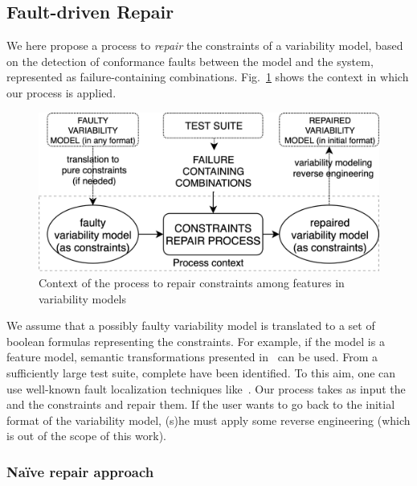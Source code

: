 \begin{tikzborder}{\cite{Gargantini16:validation}}
\begin{tikzborder}{\cite{gargantini_combinatorial_2017}}
\begin{tikzborder}{\cite{gargantini_combinatorial_2017}}
\begin{tikzborder}{\cite{garn2019}}
\begin{tikzborder}{\cite{arcaini2019achieving}}
\begin{tikzborder}{\cite{arcaini2019varivolution}}
		\subsection{Fault-driven Repair}\label{sec:repair}
		
		\bb We here propose a process to {\it repair} the constraints of a variability model, based on the detection of conformance faults between the model and the system, represented as failure-containing combinations. Fig.~\ref{fig:splrepair} shows the context in which our process is applied. \be
		\begin{figure}[!ht]
			\centering
			\includegraphics[width=.8\columnwidth]{images/splrepair_new.png}
			\caption{Context of the process to repair constraints among features in variability models}
			\label{fig:splrepair}
		\end{figure}
		
		\bb We assume that a possibly faulty variability model is translated to a set of boolean formulas representing the constraints. For example, if the model is a feature model, semantic transformations presented in~\cite{batory2005feature} can be used. From a sufficiently large test suite, complete \fccs have been identified. To this aim, one can use well-known fault localization techniques like~\cite{ben_2015,iwct19}. Our process takes as input the \fccs and the constraints and repair them. If the user wants to go back to the initial format of the variability model, (s)he must apply some reverse engineering (which is out of the scope of this work).
		
		\be
		
		\subsubsection{Na{\"i}ve repair approach}\label{sec:naiveAppr}
		

\end{tikzborder}
\end{tikzborder}
\end{tikzborder}
\end{tikzborder}
\end{tikzborder}
\end{tikzborder}
